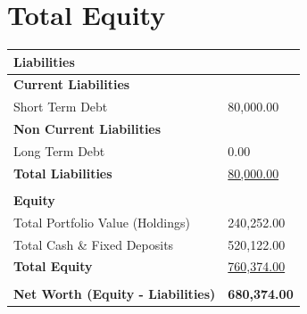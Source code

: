 \documentclass[a4paper,12pt]{article}
\begin{document}
\noindent
\section{Total Equity}
\begin{longtable}{ll}
    \toprule
    \multicolumn{2}{l}{\textbf{Liabilities}} \\
    \midrule
    \textbf{Current Liabilities} & \\
    Short Term Debt & 80,000.00 \\
    \textbf{Non Current Liabilities} & \\
    Long Term Debt & 0.00 \\
    \midrule
    \textbf{Total Liabilities} & \underline{80,000.00} \\
    \\
    \multicolumn{2}{l}{\textbf{Equity}} \\
    \midrule
    Total Portfolio Value (Holdings) & 240,252.00 \\
    Total Cash \& Fixed Deposits      & 520,122.00 \\
    \midrule
    \textbf{Total Equity} & \underline{760,374.00} \\
    \\
    \textbf{Net Worth (Equity - Liabilities)} & \textbf{680,374.00} \\
    \bottomrule
\end{longtable}
\end{document}
